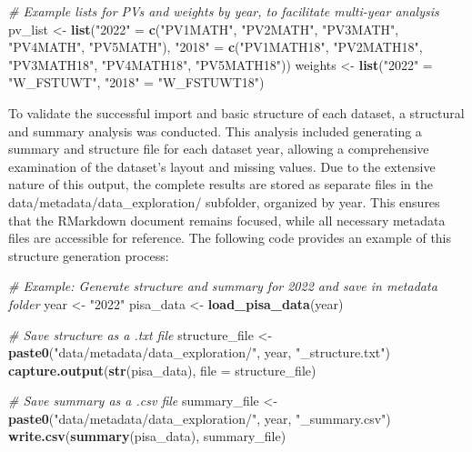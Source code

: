 \documentclass[
]{article}
\newenvironment{Shaded}{\begin{snugshade}}{\end{snugshade}}
\newcommand{\AttributeTok}[1]{\textcolor[rgb]{0.13,0.29,0.53}{#1}}
\newcommand{\CommentTok}[1]{\textcolor[rgb]{0.56,0.35,0.01}{\textit{#1}}}
\newcommand{\FunctionTok}[1]{\textcolor[rgb]{0.13,0.29,0.53}{\textbf{#1}}}
\newcommand{\NormalTok}[1]{#1}
\newcommand{\OtherTok}[1]{\textcolor[rgb]{0.56,0.35,0.01}{#1}}
\newcommand{\StringTok}[1]{\textcolor[rgb]{0.31,0.60,0.02}{#1}}
\begin{document}
\begin{Shaded}
\begin{Highlighting}[]
\CommentTok{\# Example lists for PVs and weights by year, to facilitate multi{-}year analysis}
\NormalTok{pv\_list }\OtherTok{\textless{}{-}} \FunctionTok{list}\NormalTok{(}\StringTok{"2022"} \OtherTok{=} \FunctionTok{c}\NormalTok{(}\StringTok{"PV1MATH"}\NormalTok{, }\StringTok{"PV2MATH"}\NormalTok{, }\StringTok{"PV3MATH"}\NormalTok{, }\StringTok{"PV4MATH"}\NormalTok{, }\StringTok{"PV5MATH"}\NormalTok{),}
                \StringTok{"2018"} \OtherTok{=} \FunctionTok{c}\NormalTok{(}\StringTok{"PV1MATH18"}\NormalTok{, }\StringTok{"PV2MATH18"}\NormalTok{, }\StringTok{"PV3MATH18"}\NormalTok{, }\StringTok{"PV4MATH18"}\NormalTok{, }\StringTok{"PV5MATH18"}\NormalTok{))}
\NormalTok{weights }\OtherTok{\textless{}{-}} \FunctionTok{list}\NormalTok{(}\StringTok{"2022"} \OtherTok{=} \StringTok{"W\_FSTUWT"}\NormalTok{, }\StringTok{"2018"} \OtherTok{=} \StringTok{"W\_FSTUWT18"}\NormalTok{)}
\end{Highlighting}
\end{Shaded}

To validate the successful import and basic structure of each dataset, a
structural and summary analysis was conducted. This analysis included
generating a summary and structure file for each dataset year, allowing
a comprehensive examination of the dataset's layout and missing values.
Due to the extensive nature of this output, the complete results are
stored as separate files in the data/metadata/data\_exploration/
subfolder, organized by year. This ensures that the RMarkdown document
remains focused, while all necessary metadata files are accessible for
reference. The following code provides an example of this structure
generation process:

\begin{Shaded}
\begin{Highlighting}[]
\CommentTok{\# Example: Generate structure and summary for 2022 and save in metadata folder}
\NormalTok{year }\OtherTok{\textless{}{-}} \StringTok{"2022"}
\NormalTok{pisa\_data }\OtherTok{\textless{}{-}} \FunctionTok{load\_pisa\_data}\NormalTok{(year)}

\CommentTok{\# Save structure as a .txt file}
\NormalTok{structure\_file }\OtherTok{\textless{}{-}} \FunctionTok{paste0}\NormalTok{(}\StringTok{"data/metadata/data\_exploration/"}\NormalTok{, year, }\StringTok{"\_structure.txt"}\NormalTok{)}
\FunctionTok{capture.output}\NormalTok{(}\FunctionTok{str}\NormalTok{(pisa\_data), }\AttributeTok{file =}\NormalTok{ structure\_file)}

\CommentTok{\# Save summary as a .csv file}
\NormalTok{summary\_file }\OtherTok{\textless{}{-}} \FunctionTok{paste0}\NormalTok{(}\StringTok{"data/metadata/data\_exploration/"}\NormalTok{, year, }\StringTok{"\_summary.csv"}\NormalTok{)}
\FunctionTok{write.csv}\NormalTok{(}\FunctionTok{summary}\NormalTok{(pisa\_data), summary\_file)}
\end{Highlighting}
\end{Shaded}
\end{document}
